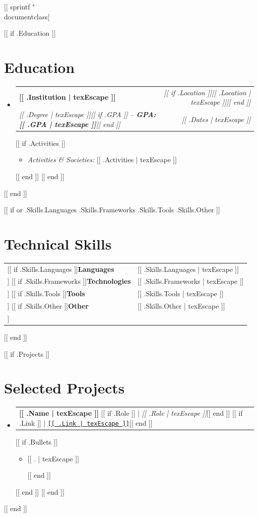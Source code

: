 [[ sprintf "\\documentclass[%
\makeatletter
\newcommand{\skySubheading}[4]{%
  \vspace{2pt}\item
  \begin{tabular*}{\linewidth}{@{}l@{\extracolsep{\fill}}r@{}}
    \textbf{\color{darkgrey}#1} & \small\textit{\color{midgrey}#2} \\
    \textit{\small\color{darkgrey}#3} & \textit{\small\color{midgrey}#4} \\
  \end{tabular*}\vspace{-2pt}%
}
\newcommand{\skyProjectRow}[2]{%
  \vspace{2pt}\item
  \begin{tabular*}{\linewidth}{@{}l@{\extracolsep{\fill}}r@{}}
    \small #1 & \small\textit{\color{midgrey}#2} \\
  \end{tabular*}\vspace{-2pt}%
}
\newcommand{\skyItem}[1]{%
  \item {\small\color{darkgrey}#1}\vspace{0pt}%
}
\newcommand{\skyListStart}{\begin{itemize}[leftmargin=0.15in, label={}]}
\newcommand{\skyListEnd}{\end{itemize}}
\newcommand{\skyBulletStart}{%
  \begin{itemize}[%
    leftmargin=0.20in,%
    label={\textcolor{skyblue}{\tiny$\blacksquare$}},%
    itemsep=1pt,%
    topsep=3pt,%
    parsep=1pt%
  ]%
}
\newcommand{\skyBulletEnd}{\end{itemize}\vspace{-2pt}}
\makeatother
\begin{document}
[[ if .Education ]]
\section{Education}
\skyListStart
  [[ range .Education ]]
  \skySubheading
    {[[ .Institution | texEscape ]]}{[[ if .Location ]][[ .Location | texEscape ]][[ end ]]}
    {[[ .Degree | texEscape ]][[ if .GPA ]] {\normalfont --} \textbf{GPA: [[ .GPA | texEscape ]]}[[ end ]]}{[[ .Dates | texEscape ]]}
    [[ if .Activities ]]
    \skyBulletStart
      \skyItem{\textit{Activities \& Societies:} [[ .Activities | texEscape ]]}
    \skyBulletEnd
    [[ end ]]
  [[ end ]]
\skyListEnd
[[ end ]]

[[ if or .Skills.Languages .Skills.Frameworks .Skills.Tools .Skills.Other ]]
\section{Technical Skills}
\vspace{-2pt}
\begin{tabular}{@{}p{3cm}@{}p{\dimexpr\linewidth-3cm\relax}@{}}
  [[ if .Skills.Languages ]]\small\textbf{\color{darkgrey}Languages}    & \small{\color{darkgrey}[[ .Skills.Languages | texEscape ]]} \\[3pt][[ end ]]
  [[ if .Skills.Frameworks ]]\small\textbf{\color{darkgrey}Technologies} & \small{\color{darkgrey}[[ .Skills.Frameworks | texEscape ]]} \\[3pt][[ end ]]
  [[ if .Skills.Tools ]]\small\textbf{\color{darkgrey}Tools}         & \small{\color{darkgrey}[[ .Skills.Tools | texEscape ]]} \\[3pt][[ end ]]
  [[ if .Skills.Other ]]\small\textbf{\color{darkgrey}Other}         & \small{\color{darkgrey}[[ .Skills.Other | texEscape ]]} \\[[ end ]]
\end{tabular}
\vspace{2pt}
[[ end ]]

[[ if .Projects ]]
\section{Selected Projects}
\skyListStart
  [[ range .Projects ]]
  \skyProjectRow{%
    \textbf{\color{darkgrey}[[ .Name | texEscape ]]}%
    [[ if .Role ]] $|$ {\emph{\color{darkgrey}[[ .Role | texEscape ]]}}[[ end ]]%
    [[ if .Link ]] $|$ \href{https://[[ .Link | texEscape ]]}{{\small\color{skyblue}\texttt{[[ .Link | texEscape ]]}}}[[ end ]]%
  }{}
  [[ if .Bullets ]]
  \skyBulletStart
    [[ range texLines .Bullets ]]\skyItem{[[ . | texEscape ]]}
    [[ end ]]
  \skyBulletEnd
  [[ end ]]
  [[ end ]]
\skyListEnd
[[ end ]]
\end{document}
